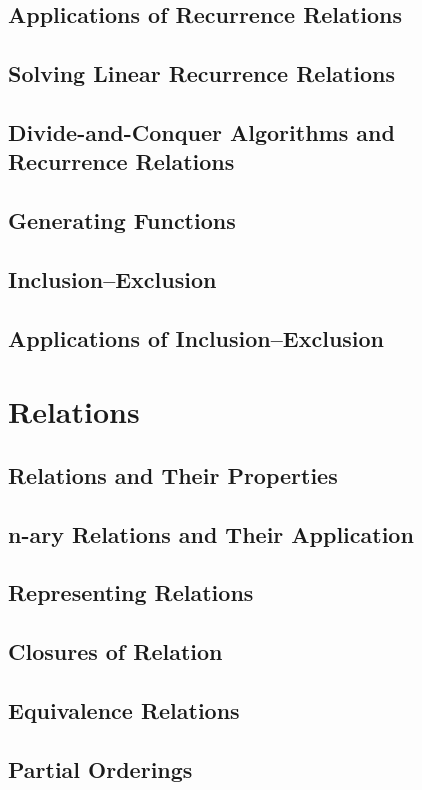 \documentclass{article}
\begin{document}
\subsection{Applications of Recurrence Relations}
\subsection{Solving Linear Recurrence Relations}
\subsection{Divide-and-Conquer Algorithms and Recurrence Relations}
\subsection{Generating Functions}
\subsection{Inclusion–Exclusion}
\subsection{Applications of Inclusion–Exclusion}

\section{Relations}

\subsection{Relations and Their Properties}
\subsection{n-ary Relations and Their Application}
\subsection{Representing Relations}
\subsection{Closures of Relation}
\subsection{Equivalence Relations}
\subsection{Partial Orderings}
\end{document}
